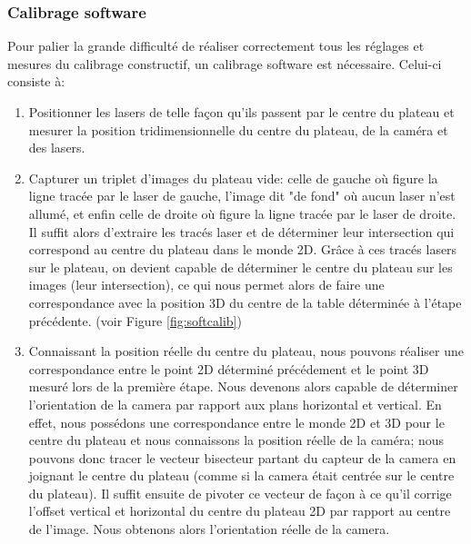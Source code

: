 \documentclass[a4paper,10pt]{report}
\begin{document}
\subsubsection{Calibrage software}
Pour palier la grande difficulté de réaliser correctement tous les réglages et mesures du calibrage constructif, un calibrage software est nécessaire. Celui-ci consiste à:
\begin{enumerate}
\item Positionner les lasers de telle façon qu'ils passent par le centre du plateau et mesurer la position tridimensionnelle du centre du plateau, de la caméra et des lasers.
\item Capturer un triplet d'images du plateau vide: celle de gauche où figure la ligne tracée par le laser de gauche, l'image dit "de fond" où aucun laser n'est allumé, et enfin celle de droite où figure la ligne tracée par le laser de droite. Il suffit alors d'extraire les tracés laser et de déterminer leur intersection qui correspond au centre du plateau dans le monde 2D. Grâce à ces tracés lasers sur le plateau, on devient capable de déterminer le centre du plateau sur les images (leur intersection), ce qui nous permet alors de faire une correspondance avec la position 3D du centre de la table déterminée à l'étape précédente. (voir Figure \ref{fig:softcalib})
\item Connaissant la position réelle du centre du plateau, nous pouvons réaliser une correspondance entre le point 2D déterminé précédement et le point 3D mesuré lors de la première étape. Nous devenons alors capable de déterminer l'orientation de la camera par rapport aux plans horizontal et vertical. En effet, nous possédons une correspondance entre le monde 2D et 3D pour le centre du plateau et nous connaissons la position réelle de la caméra; nous pouvons donc tracer le vecteur bisecteur partant du capteur de la camera en joignant le centre du plateau (comme si la camera était centrée sur le centre du plateau). Il suffit ensuite de pivoter ce vecteur de façon à ce qu'il corrige l'offset vertical et horizontal du centre du plateau 2D par rapport au centre de l'image. Nous obtenons alors l'orientation réelle de la camera.


\end{enumerate}
\end{document}
